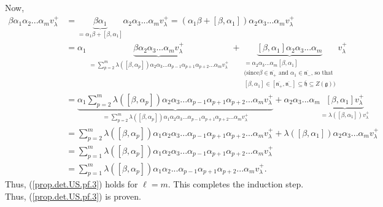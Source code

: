 \documentclass
[numbers=enddot,12pt,final,onecolumn,german,notitlepage]{scrartcl}%
\theoremstyle{definition}
\begin{document}
Now,%
\begin{align*}
\beta\alpha_{1}\alpha_{2}...\alpha_{m}v_{\lambda}^{+}  &  =\underbrace{\beta
\alpha_{1}}_{=\alpha_{1}\beta+\left[  \beta,\alpha_{1}\right]  }\alpha
_{2}\alpha_{3}...\alpha_{m}v_{\lambda}^{+}=\left(  \alpha_{1}\beta+\left[
\beta,\alpha_{1}\right]  \right)  \alpha_{2}\alpha_{3}...\alpha_{m}v_{\lambda
}^{+}\\
&  =\alpha_{1}\underbrace{\beta\alpha_{2}\alpha_{3}...\alpha_{m}v_{\lambda
}^{+}}_{\substack{=\sum\limits_{p=2}^{m}\lambda\left(  \left[  \beta
,\alpha_{p}\right]  \right)  \alpha_{2}\alpha_{3}...\alpha_{p-1}\alpha
_{p+1}\alpha_{p+2}...\alpha_{m}v_{\lambda}^{+}}}+\underbrace{\left[
\beta,\alpha_{1}\right]  \alpha_{2}\alpha_{3}...\alpha_{m}}_{\substack{=\alpha
_{2}\alpha_{3}...\alpha_{m}\left[  \beta,\alpha_{1}\right]  \\\text{(since
}\beta\in\overline{\mathfrak{n}_{+}}\text{ and }\alpha_{1}\in\overline
{\mathfrak{n}_{-}}\text{, so that}\\\left[  \beta,\alpha_{1}\right]
\in\left[  \overline{\mathfrak{n}_{+}},\overline{\mathfrak{n}_{-}}\right]
\subseteq\overline{\mathfrak{h}}\subseteq Z\left(  \mathfrak{g}\right)
\text{)}}}v_{\lambda}^{+}\\
&  =\underbrace{\alpha_{1}\sum\limits_{p=2}^{m}\lambda\left(  \left[
\beta,\alpha_{p}\right]  \right)  \alpha_{2}\alpha_{3}...\alpha_{p-1}%
\alpha_{p+1}\alpha_{p+2}...\alpha_{m}v_{\lambda}^{+}}_{=\sum\limits_{p=2}%
^{m}\lambda\left(  \left[  \beta,\alpha_{p}\right]  \right)  \alpha_{1}%
\alpha_{2}\alpha_{3}...\alpha_{p-1}\alpha_{p+1}\alpha_{p+2}...\alpha
_{m}v_{\lambda}^{+}}+\alpha_{2}\alpha_{3}...\alpha_{m}\underbrace{\left[
\beta,\alpha_{1}\right]  v_{\lambda}^{+}}_{=\lambda\left(  \left[
\beta,\alpha_{1}\right]  \right)  v_{\lambda}^{+}}\\
&  =\sum\limits_{p=2}^{m}\lambda\left(  \left[  \beta,\alpha_{p}\right]
\right)  \alpha_{1}\alpha_{2}\alpha_{3}...\alpha_{p-1}\alpha_{p+1}\alpha
_{p+2}...\alpha_{m}v_{\lambda}^{+}+\lambda\left(  \left[  \beta,\alpha
_{1}\right]  \right)  \alpha_{2}\alpha_{3}...\alpha_{m}v_{\lambda}^{+}\\
&  =\sum\limits_{p=1}^{m}\lambda\left(  \left[  \beta,\alpha_{p}\right]
\right)  \alpha_{1}\alpha_{2}\alpha_{3}...\alpha_{p-1}\alpha_{p+1}\alpha
_{p+2}...\alpha_{m}v_{\lambda}^{+}\\
&  =\sum\limits_{p=1}^{m}\lambda\left(  \left[  \beta,\alpha_{p}\right]
\right)  \alpha_{1}\alpha_{2}...\alpha_{p-1}\alpha_{p+1}\alpha_{p+2}%
...\alpha_{m}v_{\lambda}^{+}.
\end{align*}
Thus, (\ref{prop.det.US.pf.3}) holds for $\ell=m$. This completes the
induction step. Thus, (\ref{prop.det.US.pf.3}) is proven.
\end{document}
